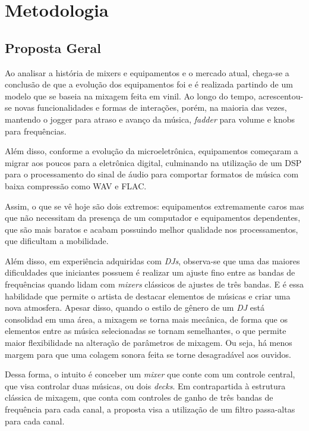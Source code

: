 \chapter[Metodologia]{Metodologia}


\section{Proposta Geral}
Ao analisar a história de mixers e equipamentos e o mercado atual, chega-se a conclusão de que a evolução dos equipamentos foi e é realizada partindo de um modelo que se baseia na mixagem feita em vinil. Ao longo do tempo, acrescentou-se novas funcionalidades e formas de interações, porém, na maioria das vezes, mantendo o jogger para atraso e avanço da música, \textit{fadder} para volume e knobs para frequências.
\par
Além disso, conforme a evolução da microeletrônica, equipamentos começaram a migrar aos poucos para a eletrônica digital, culminando na utilização de um DSP para o processamento do sinal de áudio para comportar formatos de música com baixa compressão como WAV e FLAC. 
\par
Assim, o que se vê hoje são dois extremos: equipamentos extremamente caros mas que não necessitam da presença de um computador e equipamentos dependentes, que são mais baratos e acabam possuindo melhor qualidade nos processamentos, que dificultam a mobilidade.
\par
Além disso, em experiência adquiridas com \textit{DJs}, observa-se que uma das maiores dificuldades que iniciantes possuem é realizar um ajuste fino entre as bandas de frequências quando lidam com \textit{mixers} clássicos de ajustes de três bandas. E é essa habilidade que permite o artista de destacar elementos de músicas e criar uma nova atmosfera. Apesar disso, quando o estilo de gênero de um \textit{DJ} está consolidad em uma área, a mixagem se torna mais mecânica, de forma que os elementos entre as música selecionadas se tornam semelhantes, o que permite maior flexibilidade na alteração de parâmetros de mixagem. Ou seja, há menos margem para que uma colagem sonora feita se torne desagradável aos ouvidos.
\par
Dessa forma, o intuito é conceber um \textit{mixer} que conte com um controle central, que visa controlar duas músicas, ou dois \textit{decks}. Em contrapartida à estrutura clássica de mixagem, que conta com controles de ganho de três bandas de frequência para cada canal, a proposta visa a utilização de um filtro passa-altas para cada canal. 

